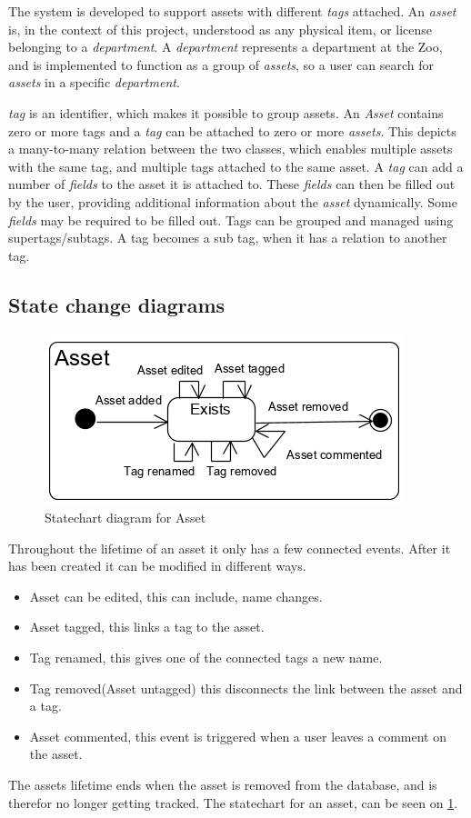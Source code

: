 The system is developed to support assets with different \textit{tags} attached. An \textit{asset} is, in the context of this project, understood as any physical item, or license belonging to a \textit{department}. A \textit{department} represents a department at the Zoo, and is implemented to function as a group of \textit{assets}, so a user can search for \textit{assets} in a specific \textit{department}.
\par
\textit{tag} is an identifier, which makes it possible to group assets. An \textit{Asset} contains zero or more tags and a \textit{tag} can be attached to zero or more \textit{assets}. This depicts a many-to-many relation between the two classes, which enables multiple assets with the same tag, and multiple tags attached to the same asset. A \textit{tag} can add a number of \textit{fields} to the asset it is attached to. These \textit{fields} can then be filled out by the user, providing additional information about the \textit{asset} dynamically. Some \textit{fields} may be required to be filled out.
Tags can be grouped and managed using supertags/subtags. A tag becomes a sub tag, when it has a relation to another tag.

\subsection{State change diagrams}

\begin{figure}[H]
    \centering
    \includegraphics{figures/Asset_statechart.png}
    \caption{Statechart diagram for Asset}
    \label{fig:asset_statechart}
\end{figure}

Throughout the lifetime of an asset it only has a few connected events. After it has been created it can be modified in different ways. 
\begin{itemize}
    \item Asset can be edited, this can include, name changes.
    \item Asset tagged, this links a tag to the asset.
    \item Tag renamed, this gives one of the connected tags a new name.
    \item Tag removed(Asset untagged) this disconnects the link between the asset and a tag.
    \item Asset commented, this event is triggered when a user leaves a comment on the asset.
\end{itemize}
The assets lifetime ends when the asset is removed from the database, and is therefor no longer getting tracked. The statechart for an asset, can be seen on \ref{fig:asset_statechart}.

